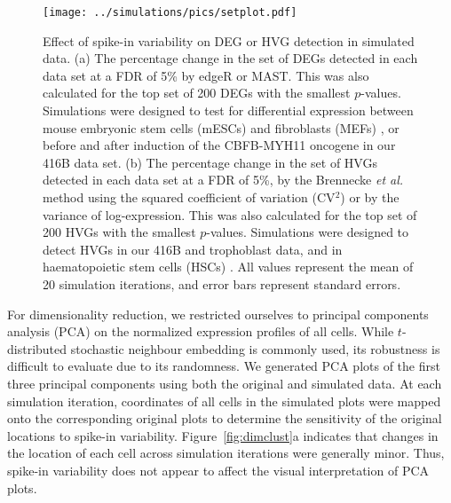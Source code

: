 \documentclass{article}
\begin{document}
\begin{figure}[bt]
    \begin{center}
        \texttt{[image: ../simulations/pics/setplot.pdf]}
    \end{center}
    \caption{Effect of spike-in variability on DEG or HVG detection in simulated data.
        (a) The percentage change in the set of DEGs detected in each data set at a FDR of 5\% by edgeR or MAST.
        This was also calculated for the top set of 200 DEGs with the smallest $p$-values.
        Simulations were designed to test for differential expression between mouse embryonic stem cells (mESCs) and fibroblasts (MEFs) \cite{islam2011characterization},
        or before and after induction of the CBFB-MYH11 oncogene in our 416B data set.
        (b) The percentage change in the set of HVGs detected in each data set at a FDR of 5\%,
        by the Brennecke \textit{et al.} method using the squared coefficient of variation (CV$^2$) or by the variance of log-expression.
        This was also calculated for the top set of 200 HVGs with the smallest $p$-values.
        Simulations were designed to detect HVGs in our 416B and trophoblast data, and in haematopoietic stem cells (HSCs) \cite{wilson2015combined}.
        All values represent the mean of 20 simulation iterations, and error bars represent standard errors.
    }
    \label{fig:setchange}
\end{figure}

For dimensionality reduction, we restricted ourselves to principal components analysis (PCA) on the normalized expression profiles of all cells. 
While $t$-distributed stochastic neighbour embedding \cite{van2008visualizing} is commonly used, its robustness is difficult to evaluate due to its randomness.
We generated PCA plots of the first three principal components using both the original and simulated data.
At each simulation iteration, coordinates of all cells in the simulated plots were mapped onto the corresponding original plots to determine the sensitivity of the original locations to spike-in variability.
Figure~\ref{fig:dimclust}a indicates that changes in the location of each cell across simulation iterations were generally minor.
Thus, spike-in variability does not appear to affect the visual interpretation of PCA plots.
\end{document}
